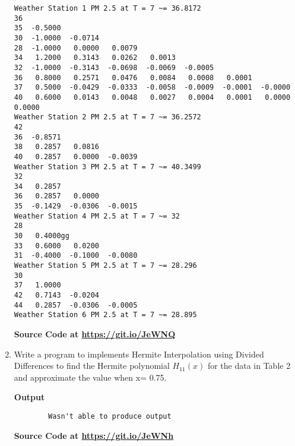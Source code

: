 \documentclass{exam}
\begin{document}
\begin{enumerate}
\begin{verbatim}
Weather Station 1 PM 2.5 at T = 7 ~= 36.8172
36
35  -0.5000
30  -1.0000  -0.0714
28  -1.0000   0.0000   0.0079
34   1.2000   0.3143   0.0262   0.0013
32  -1.0000  -0.3143  -0.0698  -0.0069  -0.0005
36   0.8000   0.2571   0.0476   0.0084   0.0008   0.0001
37   0.5000  -0.0429  -0.0333  -0.0058  -0.0009  -0.0001  -0.0000
40   0.6000   0.0143   0.0048   0.0027   0.0004   0.0001   0.0000   0.0000
Weather Station 2 PM 2.5 at T = 7 ~= 36.2572
42
36  -0.8571
38   0.2857   0.0816
40   0.2857   0.0000  -0.0039
Weather Station 3 PM 2.5 at T = 7 ~= 40.3499
32
34   0.2857
36   0.2857   0.0000
35  -0.1429  -0.0306  -0.0015
Weather Station 4 PM 2.5 at T = 7 ~= 32
28
30   0.4000gg
33   0.6000   0.0200
31  -0.4000  -0.1000  -0.0080
Weather Station 5 PM 2.5 at T = 7 ~= 28.296
30
37   1.0000
42   0.7143  -0.0204
44   0.2857  -0.0306  -0.0005
Weather Station 6 PM 2.5 at T = 7 ~= 28.895
    \end{verbatim}
    \begin{center}
        \textbf{Source Code at \url{https://git.io/JeWNQ}}
    \end{center}
	\newpage
	\item  Write  a  program  to  implements  Hermite  Interpolation  using  Divided  Differences to find the Hermite polynomial $H_{11}(x)$ for the data in Table 2 and approximate the value when x= 0.75.
    \begin{center}
        \textbf{Output}
    \end{center}
    \begin{verbatim}
		Wasn't able to produce output
    \end{verbatim}
    \begin{center}
        \textbf{Source Code at \url{https://git.io/JeWNh}}
    \end{center}
\end{enumerate}
\newpage
\end{document}
